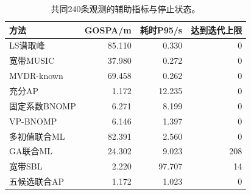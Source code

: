 \begin{table}[pos=H]\centering\small
\caption{共同240条观测的辅助指标与停止状态。}\label{tab:auxiliary}
\begin{tabular}{@{}lrrr@{}}\toprule
方法 & GOSPA/m & 耗时P95/s & 达到迭代上限\\\midrule
LS谱取峰 & 85.110 & 0.330 & 0\\
宽带MUSIC & 37.980 & 0.272 & 0\\
MVDR-known & 69.458 & 0.262 & 0\\
充分AP & 1.172 & 12.235 & 0\\
固定系数BNOMP & 6.271 & 8.199 & 0\\
VP-BNOMP & 6.146 & 1.397 & 0\\
多初值联合ML & 82.391 & 2.560 & 0\\
GA联合ML & 24.302 & 9.023 & 208\\
宽带SBL & 2.220 & 97.707 & 14\\
五候选联合AP & 1.172 & 1.023 & 0\\
\bottomrule\end{tabular}\end{table}
